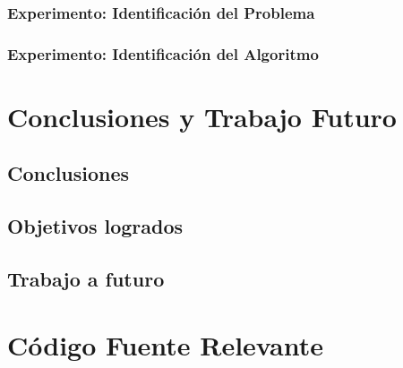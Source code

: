 \documentclass[12pt, letterpaper, oneside]{book}
\begin{document}
\subsection{Experimento: Identificación del Problema}



\subsection{Experimento: Identificación del Algoritmo}

\chapter{Conclusiones y Trabajo Futuro}\label{conclusiones}



\section{Conclusiones}



\section{Objetivos logrados}


\section{Trabajo a futuro}





\printbibliography[title={Referencias Bibliográficas}, heading=bibintoc]

\appendix
\chapter{Código Fuente Relevante}\label{codigo}
\end{document}
